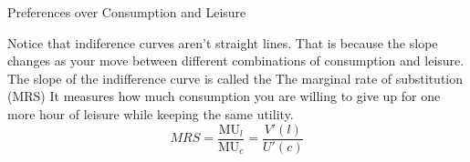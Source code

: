 \documentclass[10pt,aspectratio=169]{beamer}
\begin{document}
\begin{frame}{Preferences over Consumption and Leisure}
\begin{itemize}
    \itemvso Notice that indiference curves aren't straight lines.
    \itemvso That is because the slope changes as your move between different combinations of consumption and leisure.
    \itemvso The slope of the indifference curve is called the The marginal rate of substitution (MRS)
    \itemvso It measures how much consumption you are willing to give up for one more hour of leisure while keeping the same utility.
    \[
        MRS = \frac{\text{MU}_l}{\text{MU}_c} = \frac{V'(l)}{U'(c)}
    \]
\end{itemize}   
\end{frame}

\end{document}
